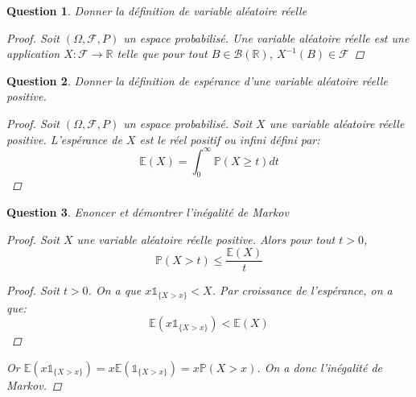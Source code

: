 \documentclass{article}
\theoremstyle{plain}
\newtheorem{question}{Question}
\begin{document}
\begin{question}
	Donner la définition de variable aléatoire réelle
	\begin{proof}
		Soit $(\Omega, \mathscr{F}, P)$ un espace probabilisé. Une variable aléatoire réelle est une application $X:\mathscr{F} \to \mathbb{R}$  telle que pour tout $B \in \mathscr{B} (\mathbb{R})$, $X^{-1} (B) \in \mathscr{F}$
	\end{proof}
\end{question}

\begin{question}
	Donner la définition de espérance d'une variable aléatoire réelle positive.
	\begin{proof}
		Soit $(\Omega, \mathscr{F}, P)$ un espace probabilisé. Soit $X$ une variable aléatoire réelle positive. L'espérance de $X$ est le réel positif ou infini défini par:
		\begin{equation*}
			\mathbb{E} (X) = \int_0^{\infty} \mathbb{P} (X \ge t) dt
		\end{equation*}
	\end{proof}
\end{question}

\begin{question}
	Enoncer et démontrer l'inégalité de Markov
	\begin{proof}
		Soit $X$ une variable aléatoire réelle positive. Alors pour tout $t > 0$,
		\begin{equation*}
			\mathbb{P} (X > t) \le \frac{\mathbb{E} (X)}{t}
		\end{equation*}
		\begin{proof}
			Soit $t > 0$. On a que $x\mathds{1}_{\{X > x\}} < X$. Par croissance de l'espérance, on a que:
			\begin{equation*}
				\mathbb{E} (x\mathds{1}_{\{X > x\}}) < \mathbb{E} (X)
			\end{equation*}
		\end{proof}
		Or $\mathbb{E} (x\mathds{1}_{\{X > x\}}) = x\mathbb{E} (\mathds{1}_{\{X > x\}}) = x\mathbb{P} (X > x)$.
		On a donc l'inégalité de Markov.

	\end{proof}
\end{question}
\end{document}
